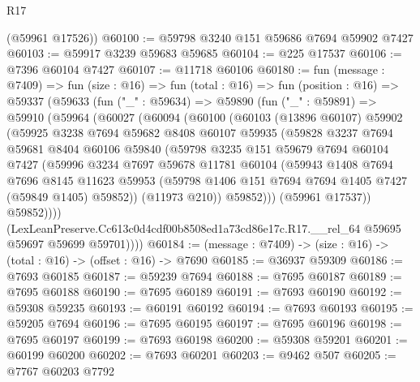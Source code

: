 \begin{lexlean}{R17}
\begin{coremodule}
      (@59961 @17526))
@60100 := @59798 @3240 @151 @59686 @7694 @59902 @7427
@60103 := @59917 @3239 @59683 @59685
@60104 := @225 @17537
@60106 := @7396 @60104 @7427
@60107 := @11718 @60106
@60180 := fun (message : @7409) =>
  fun (size : @16) =>
  fun (total : @16) =>
  fun (position : @16) =>
  @59337
    (@59633
      (fun ("_" : @59634) =>
      @59890
        (fun ("_" : @59891) =>
        @59910
          (@59964
            (@60027
              (@60094
                (@60100
                  (@60103
                    (@13896 @60107)
                    @59902
                    (@59925
                      @3238
                      @7694
                      @59682
                      @8408
                      @60107
                      @59935
                      (@59828
                        @3237
                        @7694
                        @59681
                        @8404
                        @60106
                        @59840
                        (@59798
                          @3235
                          @151
                          @59679
                          @7694
                          @60104
                          @7427
                          (@59996
                            @3234
                            @7697
                            @59678
                            @11781
                            @60104
                            (@59943
                              @1408
                              @7694
                              @7696
                              @8145
                              @11623
                              @59953
                              (@59798 @1406 @151 @7694 @7694 @1405 @7427 (@59849 @1405) @59852))
                            (@11973 @210))
                          @59852)))
                    (@59961 @17537))
                  @59852))))
          (LexLeanPreserve.Cc613c0d4cdf00b8508ed1a73cd86e17c.R17.__rel_64
            @59695
            @59697
            @59699
            @59701))))
@60184 := (message : @7409) -> (size : @16) -> (total : @16) -> (offset : @16) -> @7690
@60185 := @36937 @59309
@60186 := @7693 @60185
@60187 := @59239 @7694
@60188 := @7695 @60187
@60189 := @7695 @60188
@60190 := @7695 @60189
@60191 := @7693 @60190
@60192 := @59308 @59235
@60193 := @60191 @60192
@60194 := @7693 @60193
@60195 := @59205 @7694
@60196 := @7695 @60195
@60197 := @7695 @60196
@60198 := @7695 @60197
@60199 := @7693 @60198
@60200 := @59308 @59201
@60201 := @60199 @60200
@60202 := @7693 @60201
@60203 := @9462 @507
@60205 := @7767 @60203 @7792

\end{coremodule}
\end{lexlean}
